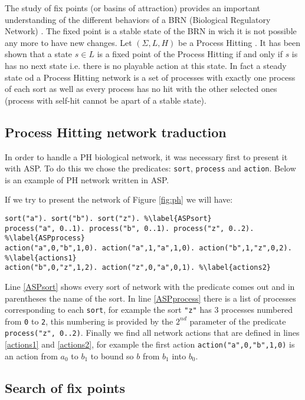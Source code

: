 The study of fix points (or basins of attraction) provides an important understanding of the different behaviors of a BRN (Biological Regulatory Network) \cite{wuensche1998genomic}.  
The fixed point is a stable state of the BRN in wich it is not possible any more to have new changes.
Let $(\Sigma, L, H)$ be a Process Hitting .
 It has been shown that a state $s \in L$ is a fixed point of the Process Hitting if and only if $s$ is has no next state \cite{pauleve2011modelisation} i.e. there is no playable action at this state. In fact a steady state od a Process Hitting network is a set of processes with exactly one process of each sort as well as every process has no hit with the other selected ones (process with self-hit cannot be apart of a stable state).

\subsection{Process Hitting network traduction }
In order to handle a PH biological network, it was necessary first to present it with ASP. To do this we chose the predicates: \texttt{sort}, \texttt{process} and \texttt{action}. Below is an example of PH network written in ASP.

\begin{example*} 
If we try to present the network of Figure \ref{fig:ph} we will have:
\begin{lstlisting}
sort("a"). sort("b"). sort("z"). %\label{ASPsort}
process("a", 0..1). process("b", 0..1). process("z", 0..2). %\label{ASPprocess}
action("a",0,"b",1,0). action("a",1,"a",1,0). action("b",1,"z",0,2). %\label{actions1}
action("b",0,"z",1,2). action("z",0,"a",0,1). %\label{actions2}
\end{lstlisting}
Line \ref{ASPsort} shows every sort of network with the predicate comes out and in parentheses the name of the sort. In line \ref{ASPprocess} there is a list of processes corresponding to each \texttt{sort}, for example the sort \texttt{"z"} has 3 processes numbered from \texttt{0} to \texttt{2}, this numbering is provided by the $2^{nd}$ parameter of the predicate \texttt{process("z", 0..2)}. Finally we find all network actions that are defined in lines \ref{actions1} and \ref{actions2}, for example the first action \texttt{action("a",0,"b",1,0)} is an action from $a_0$ to $b_1$ to bound so $b$ from $b_1$ into $b_0$.
\end{example*}

\subsection{Search of fix points }

